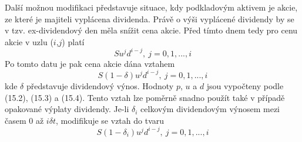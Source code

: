 \documentclass[a4paper]{book}
\begin{document}
Další možnou modifikaci představuje situace, kdy podkladovým aktivem je akcie, ze které je majiteli vyplácena dividenda. Právě o výši vyplácené dividendy by se v tzv. ex-dividendový den měla snížit cena akcie. Před tímto dnem tedy pro cenu akcie v uzlu ($i$,$j$) platí
\begin{equation*}
Su^jd^{i-j},~j=0, 1, ..., i
\end{equation*}
Po tomto datu je pak cena akcie dána vztahem
\begin{equation*}
S(1-\delta)u^jd^{i-j},~j=0, 1, ..., i
\end{equation*}
kde $\delta$ představuje dividendový výnos. Hodnoty $p$, $u$ a $d$ jsou vypočteny podle (15.2), (15.3) a (15.4). Tento vztah lze poměrně snadno použít také v případě opakované výplaty dividendy. Je-li $\delta_i$ celkovým dividendovým výnosem mezi časem 0 až $i\delta t$, modifikuje se vztah do tvaru
\begin{equation*}
S(1-\delta_i)u^jd^{i-j},~j=0, 1, ..., i
\end{equation*}
\end{document}
